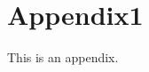 \documentclass[mainEN]{subfiles}
\begin{document}
\section{Appendix1}
This is an appendix. \cite{Haxby2425}

\ifSubfilesClassLoaded{
  \newpage
  \printbibliography
}{}
\end{document}

